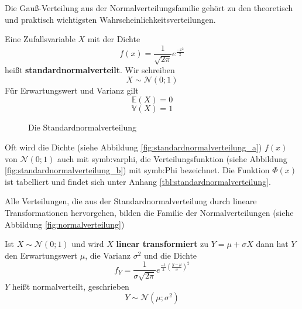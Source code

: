 {    Die Gauß-Verteilung aus der Normalverteilungsfamilie gehört zu den
    theoretisch und praktisch wichtigsten Wahrscheinlichkeitsverteilungen.
    \begin{definition}
    Eine Zufallsvariable $X$ mit der Dichte
    \[
    f\left(x\right)=\frac{1}{\sqrt{2\pi }}e^{\frac{-x^{2}}{2}}
    \]
    heißt \textbf{standardnormalverteilt}. Wir schreiben
    \[
    X\sim \mathcal N(0;1)
    \]
    Für Erwartungswert und Varianz gilt
    \[
    \mathbb E\left(X\right)=0
    \]
    \[
    \mathbb V\left(X\right)=1
    \]
    \end{definition}
    {
        \begin{figure}
            \def\muval{0}
            \def\sigmaval{1}
            \subfigure[Dichtefunktion]{
                \begin{tikzpicture}
                    
                \end{tikzpicture}
                \label{fig:standardnormalverteilung_a}
            }
            \subfigure[Verteilungsfunktion]{
                \begin{tikzpicture}
                    
                \end{tikzpicture}
                \label{fig:standardnormalverteilung_b}
            }
           \caption{Die Standardnormalverteilung}
           \label{fig:standardnormalverteilung}
        \end{figure}
    }

    Oft wird die Dichte (siehe Abbildung \ref{fig:standardnormalverteilung_a}) $f\left(x\right)$ von $\mathcal N(0; 1)$ auch mit \gls{symb:varphi}, die Verteilungsfunktion (siehe Abbildung \ref{fig:standardnormalverteilung_b}) mit
\gls{symb:Phi} bezeichnet. Die Funktion $\Phi\left(x\right)$ ist tabelliert und findet sich unter Anhang \ref{tbl:standardnormalverteilung}.

    Alle Verteilungen, die aus der Standardnormalverteilung durch lineare
    Transformationen hervorgehen, bilden die Familie der
    Normalverteilungen (siehe Abbildung \ref{fig:normalverteilung})

    \begin{definition}\label{def:transformation_normalverteilung}
        Ist $X\sim\mathcal N\left(0;1\right)$ und wird $X$ \textbf{linear transformiert} zu
    $Y=\mu +\sigma X$ dann hat $Y$ den Erwartungswert $\mu$, die Varianz
    $\sigma^{2}$ und die Dichte 
    \[
    f_{Y}=\frac{1}{\sigma \sqrt{2\pi }}e^{\frac{-1}{2}\left(\frac{y-\mu
    }{\sigma }\right)^{2}}
    \]
    $Y$ heißt normalverteilt, geschrieben
    \[
    Y\sim\mathcal N\left(\mu ;\sigma ^{2}\right)
    \]
    \end{definition}

}
